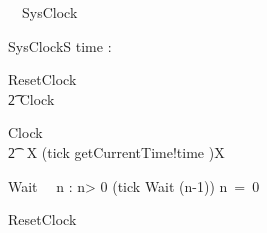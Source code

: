 \documentclass{llncs}
\begin{document}
\begin{circus}%
  \circprocess\ ~SysClock ~\circdef~\circbegin
\end{circus}
\begin{schema}{SysClockS}
 time : \nat
\end{schema}
\begin{circusaction}
  ResetClock ~\circdef~
  \\\t2  Clock\\
\end{circusaction}
\begin{circusaction}
  Clock ~\circdef~
  \\\t2  \circmu~X \circspot  (tick \then \Skip \interleave getCurrentTime!time \then \Skip)\circseq X
\end{circusaction}
\begin{circusaction}
  Wait~\circdef~ \circvar n : \nat \circspot
   \circif n> 0 \circthen (tick \then Wait (n-1))
   \circelse n~=~0 \circthen \Skip
   \circfi\\
\end{circusaction}
\begin{circus}
  \circspot ResetClock
  \circend
\end{circus}
\end{document}
